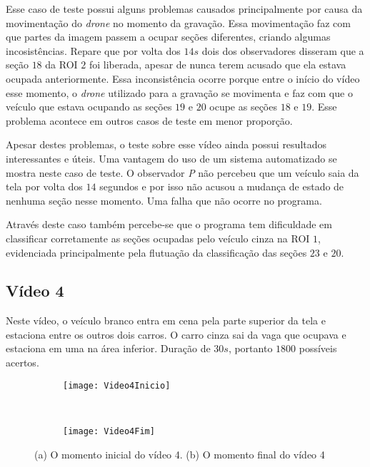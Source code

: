 Esse caso de teste possui alguns problemas causados principalmente por causa da movimentação do \textit{drone} no momento da gravação. Essa movimentação faz com que partes da imagem passem a ocupar seções diferentes, criando algumas incosistências. Repare que por volta dos $14s$ dois dos observadores disseram que a seção $18$ da ROI $2$ foi liberada, apesar de nunca terem acusado que ela estava ocupada anteriormente. Essa inconsistência ocorre porque entre o início do vídeo esse momento, o \textit{drone} utilizado para a gravação se movimenta e faz com que o veículo que estava ocupando as  seções $19$ e $20$ ocupe as seções $18$ e $19$. Esse problema acontece em outros casos de teste em menor proporção.

Apesar destes problemas, o teste sobre esse vídeo ainda possui resultados interessantes e úteis. Uma vantagem do uso de um sistema automatizado se mostra neste caso de teste. O observador \textit{P} não percebeu que um veículo saia da tela por volta dos $14$ segundos e por isso não acusou a mudança de estado de nenhuma seção nesse momento. Uma falha que não ocorre no programa. 

Através deste caso também percebe-se que o programa tem dificuldade em classificar corretamente as seções ocupadas pelo veículo cinza na ROI $1$, evidenciada principalmente pela flutuação da classificação das seções $23$ e $20$.



\subsection{Vídeo 4}

Neste vídeo, o veículo branco entra em cena pela parte superior da tela e estaciona entre os outros dois carros. O carro cinza sai da vaga que ocupava e estaciona em uma na área inferior. Duração de $30s$, portanto $1800$ possíveis acertos.

\begin{figure}[!h]
\centering
\begin{subfigure}{.5\textwidth}
\centering
\texttt{[image: Video4Inicio]}
\caption{}
\end{subfigure}\
\begin{subfigure}{.5\textwidth}
\centering
\texttt{[image: Video4Fim]}
\caption{}
\end{subfigure}
\centering
\caption{(a) O momento inicial do vídeo 4. (b) O momento final do vídeo 4}%
\label{}%
\end{figure}

